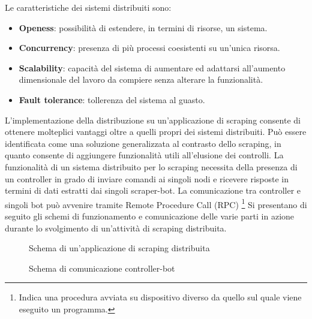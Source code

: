 Le caratteristiche dei sistemi distribuiti sono:
\begin{itemize}
    \item \textbf{Openess}: possibilit\`a di estendere, in termini di risorse, un sistema.
    \item \textbf{Concurrency}: presenza di pi\`u processi coesistenti su un'unica risorsa.
    \item \textbf{Scalability}: capacit\`a del sistema di aumentare ed adattarsi all'aumento dimensionale del lavoro da compiere senza alterare la funzionalit\`a.
    \item \textbf{Fault tolerance}: tollerenza del sistema al guasto.
\end{itemize}

L'implementazione della distribuzione su un'applicazione di scraping consente di ottenere molteplici vantaggi oltre a quelli propri dei sistemi distribuiti.
Pu\`o essere identificata come una soluzione generalizzata al contrasto dello scraping, in quanto consente di aggiungere funzionalit\`a utili all'elusione dei controlli.
La funzionalit\`a di un sistema distribuito per lo scraping necessita della presenza di un controller in grado di inviare comandi ai singoli nodi e ricevere risposte in termini di dati estratti dai singoli scraper-bot.
La comunicazione tra controller e singoli bot pu\`o avvenire tramite Remote Procedure Call (RPC) \footnote{Indica una procedura avviata su dispositivo diverso da quello sul quale viene eseguito un programma.}
Si presentano di seguito gli schemi di funzionamento e comunicazione delle varie parti in azione durante lo svolgimento di un'attivit\`a di scraping distribuita.


\begin{figure}[!htb]
  \begin{center}
  
  \caption{Schema di un'applicazione di scraping distribuita}
\end{center}
\end{figure}

\begin{figure}[!htb]
  \begin{center}
  
  \caption{Schema di comunicazione controller-bot}
\end{center}
\end{figure}
\newpage
